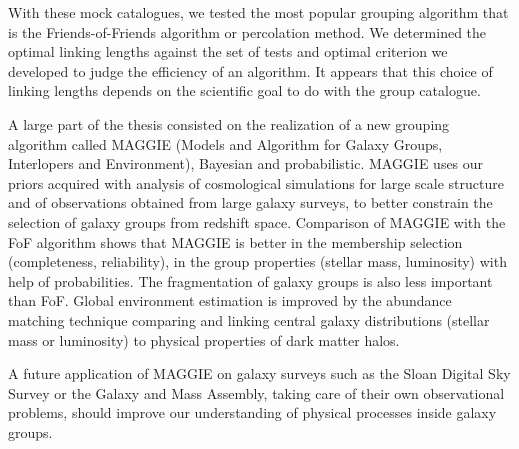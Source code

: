 \begin{bartabstract}
    With these mock catalogues, we tested the most popular grouping algorithm
    that is the Friends-of-Friends algorithm or percolation method. We
    determined the optimal linking lengths against the set of tests and optimal
    criterion we developed to judge the efficiency of an algorithm. It appears
    that this choice of linking lengths depends on the scientific goal to do
    with the group catalogue.

    A large part of the thesis consisted on the realization of a new grouping
    algorithm called MAGGIE (Models and Algorithm for Galaxy Groups,
    Interlopers and Environment), Bayesian and probabilistic. MAGGIE uses our
    priors acquired with analysis of cosmological simulations for large scale
    structure and of observations obtained from large galaxy surveys, to better
    constrain the selection of galaxy groups from redshift space. Comparison of
    MAGGIE with the FoF algorithm shows that MAGGIE is better in the membership
    selection (completeness, reliability), in the group properties (stellar
    mass, luminosity) with help of probabilities. The fragmentation of galaxy
    groups is also less important than FoF. Global environment estimation is
    improved by the abundance matching technique comparing and linking central
    galaxy distributions (stellar mass or luminosity) to physical properties of
    dark matter halos.

    A future application of MAGGIE on galaxy surveys such as the Sloan Digital
    Sky Survey or the Galaxy and Mass Assembly, taking care of their own
    observational problems, should improve our understanding of physical
    processes inside galaxy groups.
\end{bartabstract}

